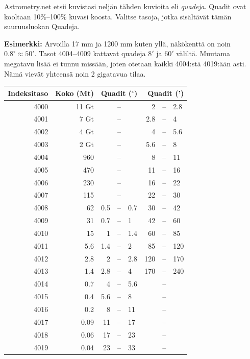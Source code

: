 \documentclass{article}
\begin{document}
Astrometry.net etsii kuvistasi neljän tähden kuvioita eli \emph{quadeja}. Quadit ovat kooltaan 10\%--100\% kuvasi koosta. Valitse tasoja, jotka sisältävät tämän suuruusluokan Quadeja.

\textbf{Esimerkki:} Arvoilla 17 mm ja 1200 mm kuten yllä, näkökenttä on noin $0.8^\circ \approx 50'$. Tasot 4004--4009 kattavat quadeja $8'$ ja $60'$ väliltä. Muutama megatavu lisää ei tunnu missään, joten otetaan kaikki 4004:stä 4019:ään asti. Nämä vievät yhteensä noin 2 gigatavua tilaa.

\begin{table}[!h]
\centering
\begin{tabular}{r r r @{ } c @{ } l r @{ } c @{ } l} \toprule
Indeksitaso 	& Koko (Mt) & \multicolumn{3}{r}{Quadit ($^\circ$)} & \multicolumn{3}{r}{Quadit (')} \\ \midrule
4000 & 11 Gt 	&  	&--& 		& 2 	&--&	2.8\\
4001 & 7 Gt 	&  	&--&  	& 2.8	&--&	4\\
4002 & 4 Gt 	&  	&--&  	& 4 	&--&	5.6\\
4003 & 2	Gt 	&  	&--&  	& 5.6	&--&	8\\
4004 & 960  	&  	&--&  	& 8 	&--&	11\\
4005 & 470  	&  	&--&  	& 11 	&--&	16\\
4006 & 230  	&  	&--&  	& 16 	&--&	22\\
4007 & 115  	&    	&--&  	& 22 	&--&	30\\
4008 & 62  		& 0.5 &--& 0.7	& 30 	&--&	42\\
4009 & 31  		& 0.7 &--& 1	& 42 	&--&	60\\
4010 & 15  		& 1 	&--& 1.4	& 60 	&--&	85\\
4011 & 5.6  	& 1.4	&--& 2	& 85 	&--&	120\\
4012 & 2.8  	& 2 	&--& 2.8	& 120 &--&	170\\
4013 & 1.4  	& 2.8	&--& 4 	& 170	&--&	240\\
4014 & 0.7  	& 4	&--& 5.6	&		&--&		\\
4015 & 0.4  	& 5.6	&--& 8 	&		&--&		\\
4016 & 0.2  	& 8	&--& 11	&		&--&		\\
4017 & 0.09  	& 11	&--& 17	&		&--&		\\
4018 & 0.06  	& 17	&--& 23	&		&--&		\\
4019 & 0.04  	& 23	&--& 33	&		&--&		\\ \bottomrule
\end{tabular}
\end{table}
\end{document}
